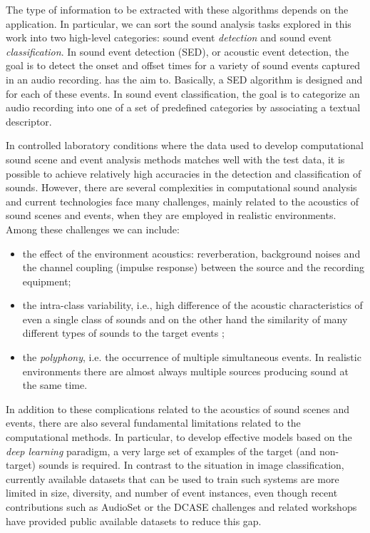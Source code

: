 The type of information to be extracted with these algorithms depends on the application. In particular, we can sort the sound analysis tasks explored in this work into two high-level categories: sound event \textit{detection} and sound event \textit{classification}.
In sound event detection (SED), or acoustic event detection, the goal is to detect the onset and offset times for a variety of sound events captured in an audio recording.
has the aim to. Basically, a SED algorithm is designed and  for each of these events.
In sound event classification, the goal is to categorize an audio recording into one of a set of predefined categories by associating a textual descriptor.


In controlled laboratory conditions where the data used to develop computational sound scene and event analysis methods matches well with the test data, it is possible to achieve relatively high accuracies in the detection and classification of sounds.  However, there are several complexities in computational sound analysis and current technologies face many challenges, mainly related to the acoustics of sound scenes and events, when they are employed in realistic environments.
Among these challenges we can include:
\begin{itemize}
	\item the effect of the environment acoustics: reverberation, background noises and the channel coupling (impulse response) between the source and the recording equipment;
	\item the intra-class variability, i.e., high difference of the acoustic characteristics of even a single class of sounds and on the other hand the similarity of many different types of sounds to the target events  \cite{stowell2015acoustic};
	\item the \textit{polyphony}, i.e. the occurrence of multiple simultaneous events. In realistic environments there
are almost always multiple sources producing sound at the same time. 
\end{itemize}

In addition to these complications related to the acoustics of sound scenes and
events, there are also several fundamental limitations related to the computational methods. In particular, to develop effective models based on the \textit{deep learning} paradigm, a very large set of examples of the
target (and non-target) sounds is required. In contrast to the situation in image classification,
 currently available datasets that can be used to train such systems are more limited in size, diversity, and number of event
 instances, even though recent contributions such as AudioSet \cite{gemmeke2017audio} or the DCASE challenges
and related workshops \cite{DCASE2017Workshop, mesaros2016tut, dcase2018web} have provided public available datasets to reduce this gap.



